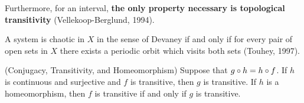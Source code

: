 \documentclass[12pt,draft,twoside]{book}
\begin{document}
Furthermore, for an interval, \textbf{the only property necessary is
topological transitivity} (Vellekoop-Berglund, 1994).

A system is chaotic in $X$ in the sense of Devaney if and only if
for every pair of open sets in $X$ there exists a periodic orbit 
which visits both sets (Touhey, 1997).

\begin{proposition}
  (Conjugacy, Transitivity, and Homeomorphism) 
  Suppose that $g \circ h = h \circ f$. If $h$ is continuous and
  surjective and $f$ is transitive, then $g$ is transitive.
  If $h$ is a homeomorphism, then $f$ is transitive if and only if
  $g$ is transitive.
\end{proposition}




\printindex
\end{document}
